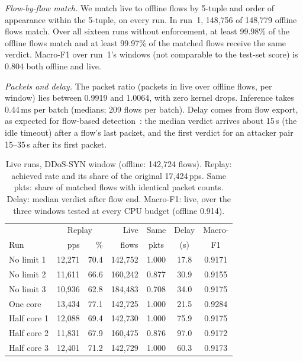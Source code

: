 \emph{Flow-by-flow match.} We match live to offline flows by 5-tuple and order of appearance within the 5-tuple, on every run. In run~1, 148,756 of 148,779 offline flows match. Over all sixteen runs without enforcement, at least 99.98\% of the offline flows match and at least 99.97\% of the matched flows receive the same verdict. Macro-F1 over run~1's windows (not comparable to the test-set score) is 0.804 both offline and live.

\emph{Packets and delay.} The packet ratio (packets in live over offline flows, per window) lies between 0.9919 and 1.0064, with zero kernel drops. Inference takes 0.44\,ms per batch (medians; 209 flows per batch). Delay comes from flow export, as expected for flow-based detection~\cite{hofstede2013realtime}: the median verdict arrives about 15\,s (the idle timeout) after a flow's last packet, and the first verdict for an attacker pair 15--35\,s after its first packet.

\begin{table}[t]
\centering
\caption{Live runs, DDoS-SYN window (offline: 142,724 flows). Replay: achieved rate and its share of the original 17,424\,pps. Same pkts: share of matched flows with identical packet counts. Delay: median verdict after flow end. Macro-F1: live, over the three windows tested at every CPU budget (offline 0.914).}
\label{tab:repeats}
\footnotesize
\setlength{\tabcolsep}{2.5pt}
\begin{tabular}{lrrrccc}
\hline
 & \multicolumn{2}{c}{Replay} & Live & Same & Delay & Macro- \\
Run & pps & \% & flows & pkts & (s) & F1 \\
\hline
No limit 1  & 12,271 & 70.4 & 142,752 & 1.000 & 17.8 & 0.9171 \\
No limit 2  & 11,611 & 66.6 & 160,242 & 0.877 & 30.9 & 0.9155 \\
No limit 3  & 10,936 & 62.8 & 184,483 & 0.708 & 34.0 & 0.9175 \\
One core    & 13,434 & 77.1 & 142,725 & 1.000 & 21.5 & 0.9284 \\
Half core 1 & 12,088 & 69.4 & 142,730 & 1.000 & 75.9 & 0.9175 \\
Half core 2 & 11,831 & 67.9 & 160,475 & 0.876 & 97.0 & 0.9172 \\
Half core 3 & 12,401 & 71.2 & 142,729 & 1.000 & 60.3 & 0.9173 \\
\hline
\end{tabular}
\end{table}

